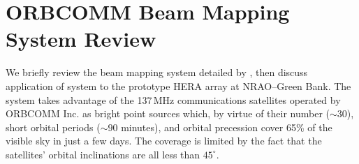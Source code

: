 \documentclass[preprint]{aastex}
\begin{document}






\section{ORBCOMM Beam Mapping System Review}

We briefly review the beam mapping system detailed by \citet{neben15}, then discuss application of system to the prototype HERA array at NRAO--Green Bank. The system takes advantage of the 137\,MHz communications satellites operated by ORBCOMM Inc. as bright point sources which, by virtue of their number ($\sim30$), short orbital periods ($\sim90$ minutes), and orbital precession cover 65\% of the visible sky in just a few days. The coverage is limited by the fact that the satellites' orbital inclinations are all less than $45^\circ$. 
\end{document}
